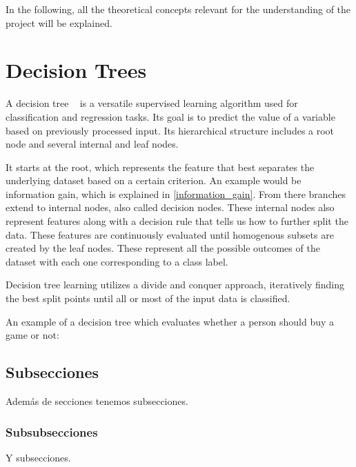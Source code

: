 
In the following, all the theoretical concepts relevant for the understanding of the project will be explained.

\section{Decision Trees}

A decision tree ~\cite{decisiontrees} is a versatile supervised learning algorithm used for classification and regression tasks. Its goal is to predict the value of a variable based on previously processed input. Its hierarchical structure includes a root node and several internal and leaf nodes.

It starts at the root, which represents the feature that best separates the underlying dataset based on a certain criterion. An example would be information gain, which is explained in \ref{information_gain}. From there branches extend to internal nodes, also called decision nodes. These internal nodes also represent features along with a decision rule that tells us how to further split the data. These features are continuously evaluated until homogenous subsets are created by the leaf nodes. These represent all the possible outcomes of the dataset with each one corresponding to a class label.

Decision tree learning utilizes a divide and conquer approach, iteratively finding the best split points until all or most of the input data is classified.

An example of a decision tree which evaluates whether a person should buy a game or not:

\subsection{Subsecciones}

Además de secciones tenemos subsecciones.

\subsubsection{Subsubsecciones}

Y subsecciones. 

